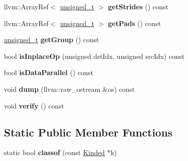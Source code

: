 \begin{DoxyCompactItemize}
\item 
\mbox{\label{classglow_1_1_convolution3_d_inst_acdae4c890cca8b147b6e679bfe651eb8}} 
llvm\+::\+Array\+Ref$<$ \hyperlink{namespaceglow_a0ca574644e1e42ef193a9947fb4d8911}{unsigned\+\_\+t} $>$ {\bfseries get\+Strides} () const
\item 
\mbox{\label{classglow_1_1_convolution3_d_inst_a9884ca28e19ff506be7fb14a28226a44}} 
llvm\+::\+Array\+Ref$<$ \hyperlink{namespaceglow_a0ca574644e1e42ef193a9947fb4d8911}{unsigned\+\_\+t} $>$ {\bfseries get\+Pads} () const
\item 
\mbox{\label{classglow_1_1_convolution3_d_inst_a513b9238ae47a301e5cf6a084f1e8c75}} 
\hyperlink{namespaceglow_a0ca574644e1e42ef193a9947fb4d8911}{unsigned\+\_\+t} {\bfseries get\+Group} () const
\item 
\mbox{\label{classglow_1_1_convolution3_d_inst_acf558ebff47efe51e28fd48141310b6c}} 
bool {\bfseries is\+Inplace\+Op} (unsigned dst\+Idx, unsigned src\+Idx) const
\item 
\mbox{\label{classglow_1_1_convolution3_d_inst_a638530d23d84573bcbba94c076f6eec5}} 
bool {\bfseries is\+Data\+Parallel} () const
\item 
\mbox{\label{classglow_1_1_convolution3_d_inst_aba0a4029ffd52b5c0a645860a5916937}} 
void {\bfseries dump} (llvm\+::raw\+\_\+ostream \&os) const
\item 
\mbox{\label{classglow_1_1_convolution3_d_inst_a3f7032b2f06b75f03ebdd94cae7b96e6}} 
void {\bfseries verify} () const
\end{DoxyCompactItemize}
\subsection*{Static Public Member Functions}
\begin{DoxyCompactItemize}
\item 
\mbox{\label{classglow_1_1_convolution3_d_inst_a2e192e65774129908480946b06f0fb27}} 
static bool {\bfseries classof} (const \hyperlink{classglow_1_1_kinded}{Kinded} $\ast$k)
\end{DoxyCompactItemize}

